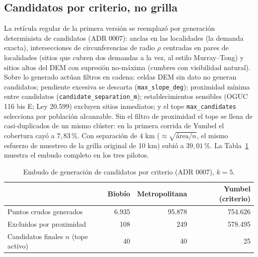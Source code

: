 \documentclass[12pt,letterpaper]{article}
\begin{document}
\subsection{Candidatos por criterio, no grilla}
\label{sec:criterio}
La retícula regular de la primera versión se reemplazó por generación determinista de candidatos (ADR 0007): anclas en las localidades (la demanda exacta), intersecciones de circunferencias de radio $\rho$ centradas en pares de localidades (sitios que cubren dos demandas a la vez, al estilo Murray--Tong) y sitios altos del DEM con supresión no-máxima (cumbres con visibilidad natural). Sobre lo generado actúan filtros en cadena: celdas DEM sin dato no generan candidatos; pendiente excesiva se descarta (\texttt{max\_slope\_deg}); proximidad mínima entre candidatos (\texttt{candidate\_separation\_m}); establecimientos sensibles (OGUC 116 bis E; Ley 20.599) excluyen sitios inmediatos; y el tope \texttt{max\_candidates} selecciona por población alcanzable. Sin el filtro de proximidad el tope se llena de casi-duplicados de un mismo clúster: en la primera corrida de Yumbel el cobertura cayó a $7{,}83$\,\%. Con separación de $4$ km ($\approx \sqrt{\text{área}/n}$, el mismo esfuerzo de muestreo de la grilla original de 10 km) subió a $39{,}01$\,\%. La Tabla~\ref{tab:criterio} muestra el embudo completo en los tres pilotos.

\begin{table}[H]
\centering\small
\begin{tabular}{lrrr}
\toprule
 & \textbf{Biobío} & \textbf{Metropolitana} & \textbf{Yumbel (criterio)} \\
\midrule
Puntos crudos generados & 6.935 & 95.878 & 754.626 \\
Excluidos por proximidad & 108 & 249 & 578.495 \\
Candidatos finales $n$ (tope activo) & 40 & 40 & 25 \\
\bottomrule
\end{tabular}
\caption{Embudo de generación de candidatos por criterio (ADR 0007), $k = 5$.}
\label{tab:criterio}
\end{table}
\end{document}
